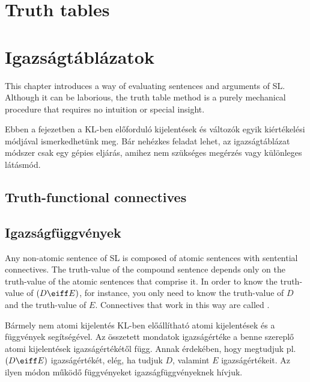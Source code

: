 

\chapter*{Truth tables}
\label{ch.TruthTables}

\chapter{Igazságtáblázatok}
\label{ch.TruthTables}

This chapter introduces a way of evaluating sentences and arguments of SL. Although it can be laborious, the truth table method is a purely mechanical procedure that requires no intuition or special insight.

Ebben a fejezetben a KL-ben előforduló kijelentések és változók egyik kiértékelési módjával ismerkedhetünk meg. Bár nehézkes feladat lehet, az igazságtáblázat módszer csak egy gépies eljárás, amihez nem szükséges megérzés vagy különleges látásmód.

\section{Truth-functional connectives}
\section{Igazságfüggvények}

Any non-atomic sentence of SL is composed of atomic sentences with sentential connectives. The truth-value of the compound sentence depends only on the truth-value of the atomic sentences that comprise it. In order to know the truth-value of $(D\eiff E)$, for instance, you only need to know the truth-value of $D$ and the truth-value of $E$. Connectives that work in this way are called .

Bármely nem atomi kijelentés KL-ben előállítható atomi kijelentések és a függvények segítségével. Az összetett mondatok igazságértéke a benne szereplő atomi kijelentések igazságértékétől függ. Annak érdekében, hogy megtudjuk pl. $(D\eiff E)$ igazságértékét, elég, ha tudjuk $D$, valamint $E$ igazságértékeit. Az ilyen módon működő függvényeket igazságfüggvényeknek hívjuk.

